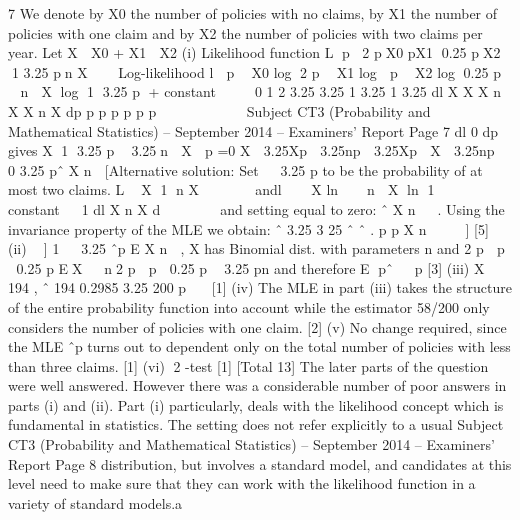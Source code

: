 7 We denote by X0 the number of policies with no claims, by X1 the number of
policies with one claim and by X2 the number of policies with two claims per year.
Let X  X0 + X1  X2
(i) Likelihood function
L p 2 pX0 pX1 0.25 pX2 1 3.25 pn X   
Log-likelihood
l  p  X0 log 2 p  X1 log  p  X2 log 0.25 p  n  X log 1 3.25 p
+ constant
    0 1 2 3.25 3.25
1 3.25 1 3.25
dl X X X n X X n X
dp p p p p p p
 
     
 
Subject CT3 (Probability and Mathematical Statistics) – September 2014 – Examiners’ Report
Page 7
dl 0
dp
 gives X 1 3.25 p  3.25n  X  p =0
X  3.25Xp  3.25np  3.25Xp  X  3.25np  0
3.25
pˆ X
n

[Alternative solution:
   Set   3.25 p to be the probability of at most two claims.
 L  X 1 n X       andl   X ln  n  X ln 1   constant
  
 1
 dl X n X
 d
 
  
   
 and setting equal to zero: ˆ X
 n
   .
 Using the invariance property of the MLE we obtain:
   ˆ 3.25
 3 25
 ˆ ˆ
 .
 p p X
 n
     ] [5]
(ii) 􀜧􁈾 ] 1  
3.25
ˆp E X
n
 , X has Binomial dist. with parameters n and
2 p  p  0.25 p
EX   n2 p  p  0.25 p  3.25 pn
and therefore E pˆ   p [3]
(iii) X  194 , ˆ 194 0.2985
3.25 200
p 

[1]
(iv) The MLE in part (iii) takes the structure of the entire probability function into
account while the estimator 58/200 only considers the number of policies with
one claim. [2]
(v) No change required, since the MLE ˆp turns out to dependent only on the total
number of policies with less than three claims. [1]
(vi) 2 -test [1]
[Total 13]
The later parts of the question were well answered. However there was a considerable
number of poor answers in parts (i) and (ii). Part (i) particularly, deals with the likelihood
concept which is fundamental in statistics. The setting does not refer explicitly to a usual
Subject CT3 (Probability and Mathematical Statistics) – September 2014 – Examiners’ Report
Page 8
distribution, but involves a standard model, and candidates at this level need to make sure
that they can work with the likelihood function in a variety of standard models.a
